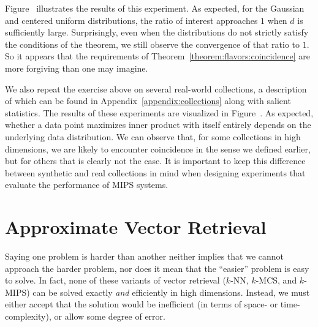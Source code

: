 Figure~ illustrates the results of this experiment.
As expected, for the Gaussian and centered uniform distributions, the ratio of interest approaches $1$
when $d$ is sufficiently large. Surprisingly, even when the distributions do not strictly satisfy
the conditions of the theorem, we still observe the convergence of that ratio to $1$. So it appears that
the requirements of Theorem~\ref{theorem:flavors:coincidence} are more forgiving than one may imagine.

We also repeat the exercise above on several real-world collections, a description of which
can be found in Appendix~\ref{appendix:collections} along with salient statistics.
The results of these experiments are visualized in Figure~.
As expected, whether a data point maximizes inner product with itself entirely depends
on the underlying data distribution. We can observe that, for some collections
in high dimensions, we are likely to encounter coincidence in the sense we defined
earlier, but for others that is clearly not the case. It is important to keep this
difference between synthetic and real collections in mind when designing experiments
that evaluate the performance of MIPS systems.

\section{Approximate Vector Retrieval}
\label{chapter:flavors:approximate}

Saying one problem is harder than another neither implies that we cannot approach
the harder problem, nor does it mean that the ``easier'' problem is easy to solve.
In fact, none of these variants of vector retrieval ($k$-NN, $k$-MCS, and $k$-MIPS)
can be solved exactly \emph{and} efficiently in high dimensions.
Instead, we must either accept that the solution would be inefficient
(in terms of space- or time-complexity), or allow some degree of error.

